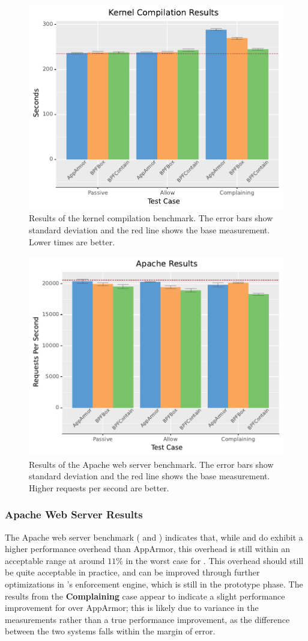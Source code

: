 \begin{figure}[htp]
  \centering
  \includegraphics[width=0.6\linewidth]{results/graphs/Kernel-Compilation.pdf}
  \caption[Results of the kernel compilation benchmark]{
    Results of the kernel compilation benchmark.
    The error bars show standard deviation and the red line shows the base measurement.
    Lower times are better.
  }%
  \label{fig:phoronix-kernel}
\end{figure}

\begin{figure}[htp]
  \centering
  \includegraphics[width=0.6\linewidth]{results/graphs/Apache.pdf}
  \caption[Results of the Apache web server benchmark]{
    Results of the Apache web server benchmark.
    The error bars show standard deviation and the red line shows the base measurement.
    Higher requests per second are better.
  }%
  \label{fig:phoronix-apache}
\end{figure}


\subsubsection{Apache Web Server Results}

The Apache web server benchmark ( and ) indicates that, while
\bpfbox{} and \bpfcontain{} do exhibit a higher performance overhead than AppArmor, this
overhead is still within an acceptable range at around $11\%$ in the worst case for
\bpfcontain{}. This overhead should still be quite acceptable in practice, and can be
improved through further optimizations in \bpfcontain{}'s enforcement engine, which is
still in the prototype phase. The results from the \textbf{Complaining} case appear to
indicate a slight performance improvement for \bpfbox{} over AppArmor; this is likely due
to variance in the measurements rather than a true performance improvement, as the
difference between the two systems falls within the margin of error.

